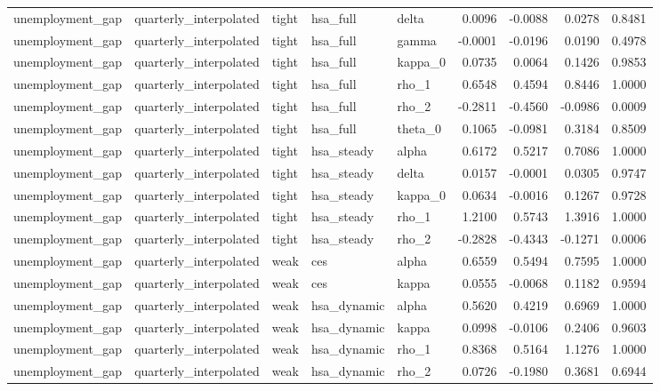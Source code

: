 \begin{tabular}{lllllrrrr}
unemployment\_gap & quarterly\_interpolated & tight & hsa\_full & delta & 0.0096 & -0.0088 & 0.0278 & 0.8481 \\
unemployment\_gap & quarterly\_interpolated & tight & hsa\_full & gamma & -0.0001 & -0.0196 & 0.0190 & 0.4978 \\
unemployment\_gap & quarterly\_interpolated & tight & hsa\_full & kappa\_0 & 0.0735 & 0.0064 & 0.1426 & 0.9853 \\
unemployment\_gap & quarterly\_interpolated & tight & hsa\_full & rho\_1 & 0.6548 & 0.4594 & 0.8446 & 1.0000 \\
unemployment\_gap & quarterly\_interpolated & tight & hsa\_full & rho\_2 & -0.2811 & -0.4560 & -0.0986 & 0.0009 \\
unemployment\_gap & quarterly\_interpolated & tight & hsa\_full & theta\_0 & 0.1065 & -0.0981 & 0.3184 & 0.8509 \\
unemployment\_gap & quarterly\_interpolated & tight & hsa\_steady & alpha & 0.6172 & 0.5217 & 0.7086 & 1.0000 \\
unemployment\_gap & quarterly\_interpolated & tight & hsa\_steady & delta & 0.0157 & -0.0001 & 0.0305 & 0.9747 \\
unemployment\_gap & quarterly\_interpolated & tight & hsa\_steady & kappa\_0 & 0.0634 & -0.0016 & 0.1267 & 0.9728 \\
unemployment\_gap & quarterly\_interpolated & tight & hsa\_steady & rho\_1 & 1.2100 & 0.5743 & 1.3916 & 1.0000 \\
unemployment\_gap & quarterly\_interpolated & tight & hsa\_steady & rho\_2 & -0.2828 & -0.4343 & -0.1271 & 0.0006 \\
unemployment\_gap & quarterly\_interpolated & weak & ces & alpha & 0.6559 & 0.5494 & 0.7595 & 1.0000 \\
unemployment\_gap & quarterly\_interpolated & weak & ces & kappa & 0.0555 & -0.0068 & 0.1182 & 0.9594 \\
unemployment\_gap & quarterly\_interpolated & weak & hsa\_dynamic & alpha & 0.5620 & 0.4219 & 0.6969 & 1.0000 \\
unemployment\_gap & quarterly\_interpolated & weak & hsa\_dynamic & kappa & 0.0998 & -0.0106 & 0.2406 & 0.9603 \\
unemployment\_gap & quarterly\_interpolated & weak & hsa\_dynamic & rho\_1 & 0.8368 & 0.5164 & 1.1276 & 1.0000 \\
unemployment\_gap & quarterly\_interpolated & weak & hsa\_dynamic & rho\_2 & 0.0726 & -0.1980 & 0.3681 & 0.6944 \\

\end{tabular}
